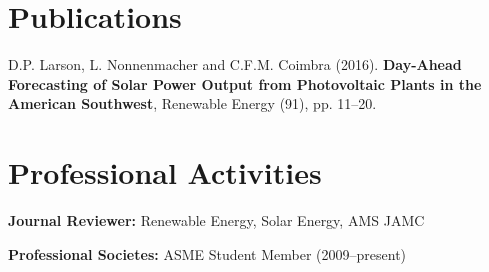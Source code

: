\documentclass[]{res}
\begin{document}
\begin{resume}
\section{Publications}
\vspace{0.1in}

D.P. Larson, L. Nonnenmacher and C.F.M. Coimbra (2016). \textbf{Day-Ahead Forecasting of Solar Power Output from Photovoltaic Plants in the American Southwest}, Renewable Energy (91), pp. 11--20.


\section{Professional Activities}
\vspace{0.1in}

\textbf{Journal Reviewer:} Renewable Energy, Solar Energy, AMS JAMC

\textbf{Professional Societes:} ASME Student Member (2009--present)



\end{resume}
\end{document}
